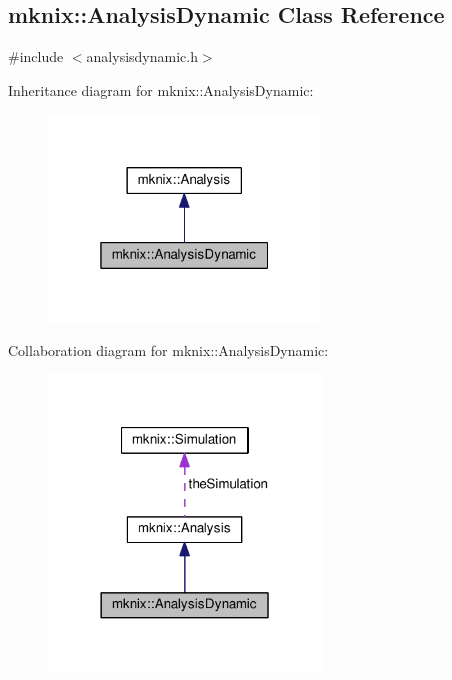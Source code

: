\hypertarget{classmknix_1_1_analysis_dynamic}{}\subsection{mknix\+:\+:Analysis\+Dynamic Class Reference}
\label{classmknix_1_1_analysis_dynamic}


{\ttfamily \#include $<$analysisdynamic.\+h$>$}



Inheritance diagram for mknix\+:\+:Analysis\+Dynamic\+:\nopagebreak
\begin{figure}[H]
\begin{center}
\leavevmode
\includegraphics[width=205pt]{da/dfd/classmknix_1_1_analysis_dynamic__inherit__graph}
\end{center}
\end{figure}


Collaboration diagram for mknix\+:\+:Analysis\+Dynamic\+:\nopagebreak
\begin{figure}[H]
\begin{center}
\leavevmode
\includegraphics[width=206pt]{d7/d8a/classmknix_1_1_analysis_dynamic__coll__graph}
\end{center}
\end{figure}
